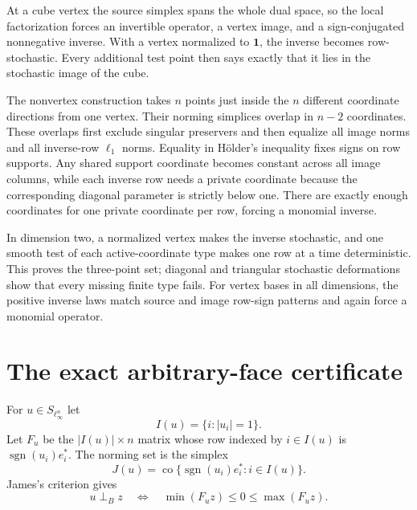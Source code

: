 \documentclass[11pt]{article}
\theoremstyle{definition}
\theoremstyle{remark}
\newcommand{\sgn}{\operatorname{sgn}}
\newcommand{\one}{\mathbf 1}
\newcommand{\perpB}{\perp_B}
\begin{document}
At a cube vertex the source simplex spans the whole dual space, so the local
factorization forces an invertible operator, a vertex image, and a
sign-conjugated nonnegative inverse.  With a vertex normalized to $\one$, the
inverse becomes row-stochastic.  Every additional test point then says
exactly that it lies in the stochastic image of the cube.

The nonvertex construction takes $n$ points just inside the $n$ different
coordinate directions from one vertex.  Their norming simplices overlap in
$n-2$ coordinates.  These overlaps first exclude singular preservers and
then equalize all image norms and all inverse-row $\ell_1$ norms.  Equality
in H\"older's inequality fixes signs on row supports.  Any shared support
coordinate becomes constant across all image columns, while each inverse row
needs a private coordinate because the corresponding diagonal parameter is
strictly below one.  There are exactly enough coordinates for one private
coordinate per row, forcing a monomial inverse.

In dimension two, a normalized vertex makes the inverse stochastic, and one
smooth test of each active-coordinate type makes one row at a time
deterministic.  This proves the three-point set; diagonal and triangular
stochastic deformations show that every missing finite type fails.  For
vertex bases in all dimensions, the positive inverse laws match source and
image row-sign patterns and again force a monomial operator.

\section{The exact arbitrary-face certificate}

For $u\in S_{\ell_\infty^n}$ let
\[
 I(u)=\{i:|u_i|=1\}.
\]
Let $F_u$ be the $|I(u)|\times n$ matrix whose row indexed by $i\in I(u)$
is $\sgn(u_i)e_i^*$.  The norming set is the simplex
\begin{equation}\label{eq:norming-simplex}
 J(u)=\operatorname{co}\{\sgn(u_i)e_i^*:i\in I(u)\}.
\end{equation}
James's criterion \cite{James} gives
\begin{equation}\label{eq:straddle-general}
 u\perpB z\quad\Longleftrightarrow\quad
 \min(F_uz)\leq0\leq\max(F_uz).
\end{equation}
\end{document}
